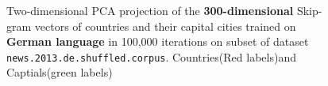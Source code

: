 \begin{figure}[htbp]
	\centering
	\caption{Two-dimensional PCA projection of the \textbf{300-dimensional} Skip-gram vectors of countries and their capital cities trained on \textbf{German language} in 100,000 iterations on subset of dataset \texttt{news.2013.de.shuffled.corpus}. Countries(Red labels)and Captials(green labels)}\label{fig:d}
\end{figure}

